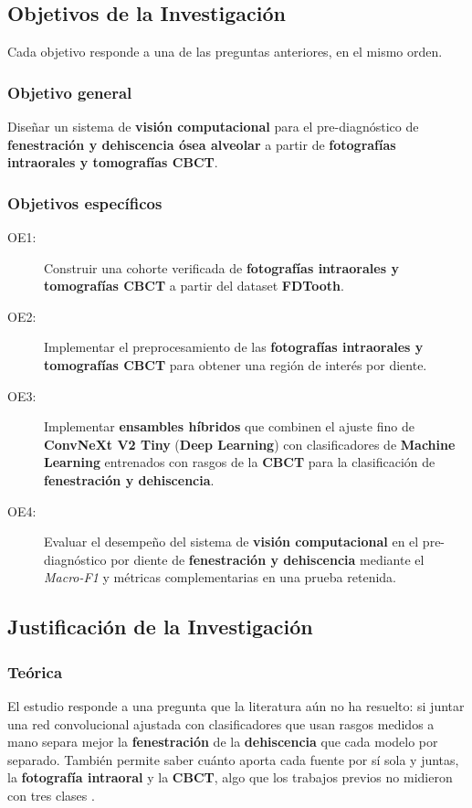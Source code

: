 \documentclass[12pt,a4paper]{article}
\newcommand{\prob}[1]{\textcolor{problema}{\textbf{#1}}}
\newcommand{\sol}[1]{\textcolor{solucion}{\textbf{#1}}}
\newcommand{\dat}[1]{\textcolor{dataset}{\textbf{#1}}}
\newcommand{\prob}[1]{#1}
\newcommand{\sol}[1]{#1}
\newcommand{\dat}[1]{#1}
\begin{document}
\subsection{Objetivos de la Investigación}
Cada objetivo responde a una de las preguntas anteriores, en el mismo
orden.

\subsubsection{Objetivo general}
Diseñar un sistema de \sol{visión computacional} para el pre-diagnóstico
de \prob{fenestración y dehiscencia ósea alveolar} a partir de
\dat{fotografías intraorales y tomografías CBCT}.

\subsubsection{Objetivos específicos}
\begin{description}
  \item[OE1:] Construir una cohorte verificada de \dat{fotografías
  intraorales y tomografías CBCT} a partir del dataset \dat{FDTooth}.
  \item[OE2:] Implementar el preprocesamiento de las \dat{fotografías
  intraorales y tomografías CBCT} para obtener una región de interés por
  diente.
  \item[OE3:] Implementar \sol{ensambles híbridos} que combinen el ajuste
  fino de \sol{ConvNeXt V2 Tiny} (\sol{Deep Learning}) con clasificadores
  de \sol{Machine Learning} entrenados con rasgos de la \dat{CBCT} para la
  clasificación de \prob{fenestración y dehiscencia}.
  \item[OE4:] Evaluar el desempeño del sistema de \sol{visión
  computacional} en el pre-diagnóstico por diente de \prob{fenestración y
  dehiscencia} mediante el \textit{Macro-F1} y métricas complementarias en
  una prueba retenida.
\end{description}

\subsection{Justificación de la Investigación}
\subsubsection{Teórica}
El estudio responde a una pregunta que la literatura aún no ha resuelto:
si juntar una red convolucional ajustada con clasificadores que usan
rasgos medidos a mano separa mejor la \prob{fenestración} de la
\prob{dehiscencia} que cada modelo por separado. También permite saber cuánto aporta
cada fuente por sí sola y juntas, la \dat{fotografía intraoral} y la
\dat{CBCT}, algo que los trabajos previos no midieron con tres clases
\parencite{liu2025fdtooth,xu2026swinunetr}.
\end{document}
